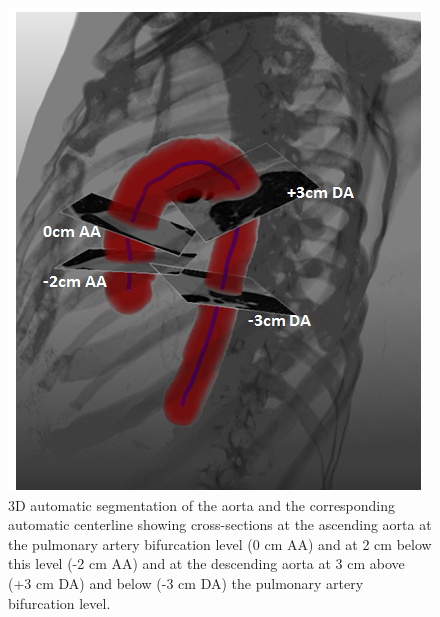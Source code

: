 \begin{figure}
\centering
\includegraphics[width=\textwidth]{Figures/Figure2.PNG}
\caption{3D automatic segmentation of the aorta and the corresponding automatic centerline showing cross-sections at the ascending aorta at the pulmonary artery bifurcation level (0 cm AA) and at 2 cm below this level (-2 cm AA) and at the descending aorta at 3 cm above (+3 cm DA) and below (-3 cm DA) the pulmonary artery bifurcation level.}
\label{fig:3D_Diameter}
\end{figure}


